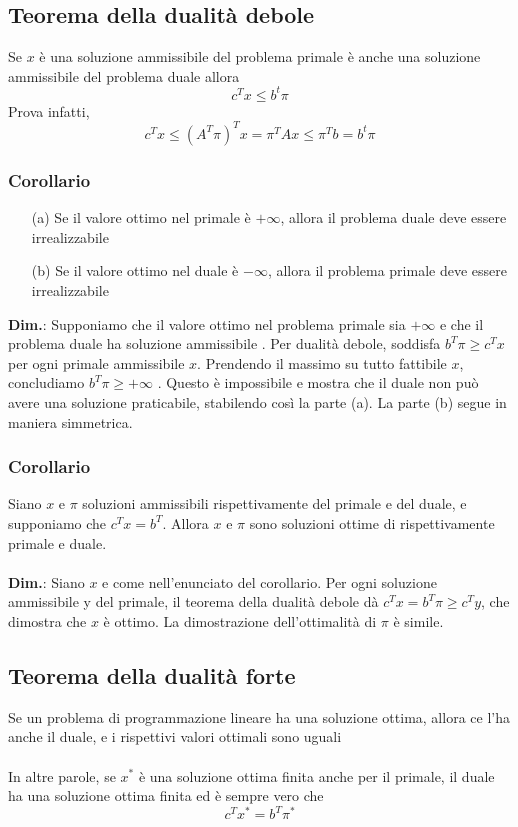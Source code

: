 \documentclass[12pt,a4paper]{article}
\begin{document}
\subsection{Teorema della dualità debole}
Se $x$ è una soluzione ammissibile del problema primale è anche una soluzione ammissibile del problema duale allora
$$c^Tx \leq b^t\pi$$
Prova infatti, $$c^Tx\leq(A^T\pi)^Tx = \pi^TAx \leq \pi^Tb=b^t\pi$$

\subsubsection{Corollario}
\begin{itemize}
\item[(a)] Se il valore ottimo nel primale è $+\infty$, allora il problema duale deve essere irrealizzabile
\item[(b)] Se il valore ottimo nel duale è $-\infty$, allora il problema primale deve essere irrealizzabile
\end{itemize}
\textbf{Dim.}: Supponiamo che il valore ottimo nel problema primale sia $+\infty$ e che il problema duale ha soluzione ammissibile . Per dualità debole, soddisfa $b^T\pi \geq c^Tx$ per ogni primale ammissibile $x$. Prendendo il massimo su tutto fattibile $x$, concludiamo $b^T\pi\geq +\infty$ . Questo è impossibile e mostra che il duale non può avere una soluzione praticabile, stabilendo così la parte (a). La parte (b) segue in maniera simmetrica.

\subsubsection{Corollario}
Siano $x$ e $\pi$ soluzioni ammissibili rispettivamente del primale e del duale, e supponiamo che $c^Tx = b^T$. Allora $x$ e $\pi$ sono soluzioni ottime di rispettivamente primale e duale.\\
\\
\textbf{Dim.}: Siano $x$ e come nell'enunciato del corollario. Per ogni soluzione ammissibile y del primale, il teorema della dualità debole dà $c^Tx=b^T\pi\geq c^Ty$, che dimostra che $x$ è ottimo. La dimostrazione dell'ottimalità di $\pi$ è simile.

\subsection{Teorema della dualità forte}
Se un problema di programmazione lineare ha una soluzione ottima, allora ce l'ha anche il duale, e i rispettivi valori ottimali sono uguali\\
\\
In altre parole, se $x^*$ è una soluzione ottima finita anche per il primale, il duale ha una soluzione ottima finita ed è sempre vero che $$c^Tx^* = b^T\pi^*$$
\end{document}
